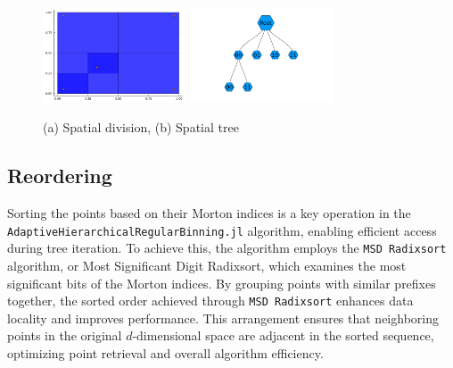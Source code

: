\documentclass{juliacon}
\begin{document}
\begin{example}
  \begin{figure}[!ht]
    \centerline{
      \includegraphics[width=10pc]{figures/spatial-division.png}
      \includegraphics[width=10pc]{figures/spatial-tree.png}
    }
    \caption{ (a) Spatial division, (b) Spatial tree }
    \label{spatial-tree}
  \end{figure}
\end{example}

\subsection{Reordering}
Sorting the points based on their Morton indices is a key operation in the
\verb|AdaptiveHierarchicalRegularBinning.jl| algorithm, enabling efficient
access during tree iteration. To achieve this, the algorithm employs the
\verb|MSD Radixsort| \cite{radixsort} algorithm, or Most Significant Digit
Radixsort, which examines the most significant bits of the Morton indices. By
grouping points with similar prefixes together, the sorted order achieved
through \verb|MSD Radixsort| enhances data locality and improves performance.
This arrangement ensures that neighboring points in the original $d$-dimensional
space are adjacent in the sorted sequence, optimizing point retrieval and
overall algorithm efficiency.
\end{document}
